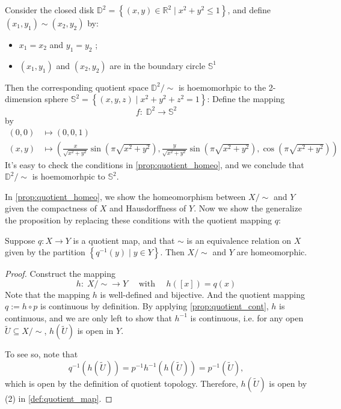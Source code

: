 \begin{example}
Consider the closed disk \({\mathbb{D}}^{2} = \left\{  {\left( {x,y}\right)  \in  {\mathbb{R}}^{2} \mid  {x}^{2} + {y}^{2} \leq  1}\right\}\), and define \(\left( {{x}_{1},{y}_{1}}\right)  \sim  \left( {{x}_{2},{y}_{2}}\right)\) by:
\begin{itemize}
\item \({x}_{1} = {x}_{2}\) and \({y}_{1} = {y}_{2}\) ;
\item \(\left( {{x}_{1},{y}_{1}}\right)\) and \(\left( {{x}_{2},{y}_{2}}\right)\) are in the boundary circle \({\mathbb{S}}^{1}\)
\end{itemize}
Then the corresponding quotient space \({\mathbb{D}}^{2}/ \sim\) is hoemomorhpic to the 2-dimension sphere \({\mathbb{S}}^{2} = \left\{  {\left( {x,y,z}\right)  \mid  {x}^{2} + {y}^{2} + {z}^{2} = 1}\right\}\): Define the mapping
\[f: \;{\mathbb{D}}^{2} \rightarrow  {\mathbb{S}}^{2} \]
by 
\begin{align*} 
\left( {0,0}\right)  &\mapsto  \left( {0,0,1}\right)\\
\left( {x,y}\right)  &\mapsto  \left( {\frac{x}{\sqrt{{x}^{2} + {y}^{2}}}\sin \left( {\pi \sqrt{{x}^{2} + {y}^{2}}}\right),\frac{y}{\sqrt{{x}^{2} + {y}^{2}}}\sin \left( {\pi \sqrt{{x}^{2} + {y}^{2}}}\right),\cos \left( {\pi \sqrt{{x}^{2} + {y}^{2}}}\right) }\right)
\end{align*}
It’s easy to check the conditions in \autoref{prop:quotient_homeo}, and we conclude that \({\mathbb{D}}^{2}/ \sim\)
is hoemomorhpic to \({\mathbb{S}}^{2}\).
\end{example}

In \autoref{prop:quotient_homeo}, we show the homeomorphism between \(X/ \sim\) and \(Y\) given the compactness of \(X\) and Hausdorffness of \(Y\). Now we show the generalize the proposition by replacing these conditions with the quotient mapping \(q\):
\begin{proposition} Suppose \(q: X \rightarrow  Y\) is a quotient map, and that \(\sim\) is an equivalence relation on \(X\) given by the partition \(\left\{  {{q}^{-1}\left( y\right)  \mid  y \in  Y}\right\}\). Then \(X/ \sim\) and \(Y\) are homeomorphic.
\end{proposition}
\begin{proof} Construct the mapping
\[
h: \;X/ \sim   \rightarrow  Y  \quad 
\text{ with } \quad h\left( \left\lbrack  x\right\rbrack  \right)  = q\left( x\right)
\]
Note that the mapping \(h\) is well-defined and bijective. And the quotient mapping \(q \mathrel{\text{:= }} h \circ  p\) is continuous by definition. By applying \autoref{prop:quotient_cont}, \(h\) is continuous, and we are only left to show that $h^{-1}$ is continuous, i.e. 
for any open \(\widetilde{U} \subseteq  X/ \sim\), \(h\left( \widetilde{U}\right)\) is open in \(Y\).

To see so, note that
\[
{q}^{-1}\left( {h\left( \widetilde{U}\right) }\right)  = {p}^{-1}{h}^{-1}\left( {h\left( \widetilde{U}\right) }\right)  = {p}^{-1}\left( \widetilde{U}\right),
\]
which is open by the definition of quotient topology. Therefore, \(h\left( \widetilde{U}\right)\) is open by (2) in \autoref{def:quotient_map}.
\end{proof}

